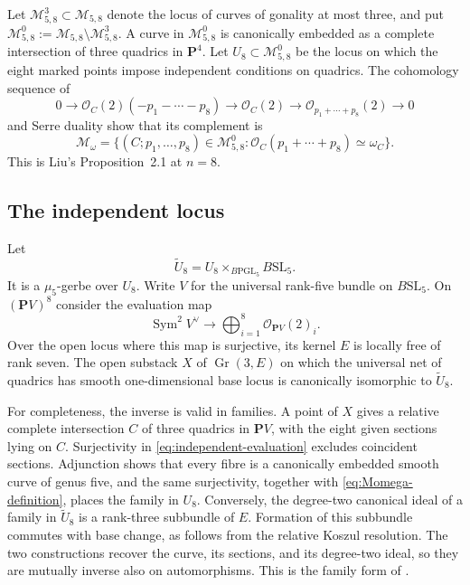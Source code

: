 \documentclass[12pt,reqno]{amsart}
\newcommand{\M}{\mathcal{M}}
\theoremstyle{definition}
\theoremstyle{remark}
\begin{document}
Let $\M^3_{5,8}\subset\M_{5,8}$ denote the locus of curves of gonality at
most three, and put $\M^0_{5,8}:=\M_{5,8}\setminus\M^3_{5,8}$.  A curve in
$\M^0_{5,8}$ is canonically embedded as a complete intersection of three
quadrics in $\mathbf P^4$.  Let $U_8\subset\M^0_{5,8}$ be the locus on which
the eight marked points impose independent conditions on quadrics.  The
cohomology sequence of
\[
 0\longrightarrow\mathcal O_C(2)(-p_1-\cdots-p_8)
 \longrightarrow\mathcal O_C(2)
 \longrightarrow\mathcal O_{p_1+\cdots+p_8}(2)\longrightarrow0
\]
and Serre duality show that its complement is
\begin{equation}\label{eq:Momega-definition}
 \M_\omega=
 \bigl\{(C;p_1,\ldots,p_8)\in\M^0_{5,8}:
 \mathcal O_C(p_1+\cdots+p_8)\simeq\omega_C\bigr\}.
\end{equation}
This is Liu's Proposition~2.1 at $n=8$.

\subsection{The independent locus}

Let
\[
 \widetilde U_8=U_8\mathbin{\times}_{B\mathrm{PGL}_5}B\mathrm{SL}_5.
\]
It is a $\mu _5$-gerbe over $U_8$.  Write $V$ for the universal rank-five
bundle on $B\mathrm{SL}_5$.  On $(\mathbf P V)^8$ consider the evaluation map
\begin{equation}\label{eq:independent-evaluation}
 \operatorname{Sym}^2V^\vee\longrightarrow
 \bigoplus_{i=1}^8\mathcal O_{\mathbf P V}(2)_i.
\end{equation}
Over the open locus where this map is surjective, its kernel $E$ is locally
free of rank seven.  The open substack $X$ of $\operatorname{Gr}(3,E)$ on
which the universal net of quadrics has smooth one-dimensional base locus is
canonically isomorphic to $\widetilde U_8$.

For completeness, the inverse is valid in families.  A point of $X$ gives a
relative complete intersection $C$ of three quadrics in $\mathbf P V$, with
the eight given sections lying on $C$.  Surjectivity in
\eqref{eq:independent-evaluation} excludes coincident sections.  Adjunction
shows that every fibre is a canonically embedded smooth curve of genus five,
and the same surjectivity, together with \eqref{eq:Momega-definition}, places
the family in $U_8$.  Conversely, the degree-two canonical ideal of a family
in $\widetilde U_8$ is a rank-three subbundle of $E$.  Formation of this
subbundle commutes with base change, as follows from the relative Koszul
resolution.  The two constructions recover the curve, its sections, and its
degree-two ideal, so they are mutually inverse also on automorphisms.  This is
the family form of \cite[Proposition~2.5]{Liu}.
\end{document}
